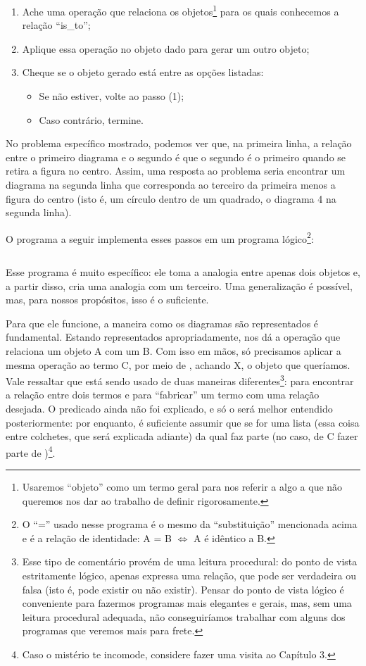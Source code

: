 \documentclass{article}
\begin{document}
\begin{enumerate}
  \item Ache uma operação que relaciona os objetos\footnote{Usaremos ``objeto'' como um termo geral para nos referir a algo a que não queremos nos dar ao trabalho de definir rigorosamente.} para os quais conhecemos a relação ``is\_to'';
  \item Aplique essa operação no objeto dado para gerar um outro objeto;
  \item Cheque se o objeto gerado está entre as opções listadas:
    \begin{itemize}
      \item Se não estiver, volte ao passo (1);
      \item Caso contrário, termine.
    \end{itemize}
\end{enumerate}

No problema específico mostrado, podemos ver que, na primeira linha, a relação entre o primeiro diagrama e o segundo é que o segundo é o primeiro quando se retira a figura no centro. Assim, uma resposta ao problema seria encontrar um diagrama na segunda linha que corresponda ao terceiro da primeira menos a figura do centro (isto é, um círculo dentro de um quadrado, o diagrama 4 na segunda linha).

O programa a seguir implementa esses passos em um programa lógico\footnote{O ``='' usado nesse programa é o mesmo da ``substituição'' mencionada acima e é a relação de identidade: A = B $\Leftrightarrow$ A é idêntico a B.}:

\inputminted{prolog}{../Exemplos/Cap1/prog3_analogy.pl}

Esse programa é muito específico: ele toma a analogia entre apenas dois objetos e, a partir disso, cria uma analogia com um terceiro. Uma generalização é possível, mas, para nossos propósitos, isso é o suficiente.

Para que ele funcione, a maneira como os diagramas são representados é fundamental. Estando
representados apropriadamente,  nos dá a operação que relaciona um objeto A com um
B. Com isso em mãos, só precisamos aplicar a mesma operação ao termo C, por meio de
, achando X, o objeto que queríamos. Vale ressaltar que  está sendo usado de duas maneiras diferentes\footnote{Esse tipo de comentário provém de uma leitura procedural: do ponto de
  vista estritamente lógico,  apenas expressa uma relação, que pode ser verdadeira ou falsa (isto é, pode existir ou não existir). Pensar do ponto de vista lógico é conveniente para fazermos programas mais elegantes e gerais, mas, sem uma leitura procedural adequada, não conseguiríamos trabalhar com alguns dos programas que veremos mais para frete.}: para encontrar a relação entre dois termos e para ``fabricar'' um termo com uma relação
desejada. O predicado  ainda não foi explicado, e só o será melhor entendido posteriormente: por enquanto, é suficiente assumir que  se  for uma lista (essa coisa entre colchetes, que será explicada adiante) da qual  faz parte (no caso, de C fazer parte de )\footnote{Caso o mistério te incomode, considere fazer uma visita ao Capítulo 3.}.
\end{document}
